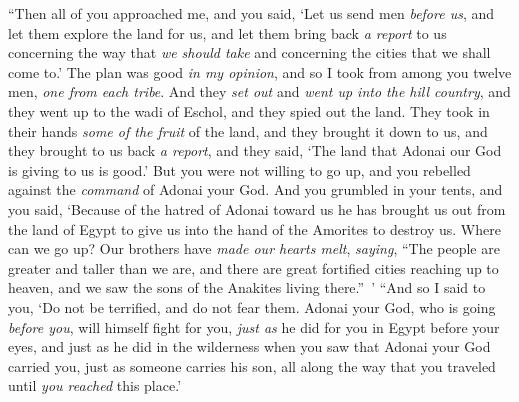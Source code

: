 \begin{biblechapter}
\verse “Then all of you approached me, and you said, ‘Let us send men \textit{before us}, and let them explore the land for us, and let them bring back \textit{a report} to us concerning the way that \textit{we should take} and concerning the cities that we shall come to.’
\verse The plan was good \textit{in my opinion}, and so I took from among you twelve men, \textit{one from each tribe}.
\verse And they \textit{set out} and \textit{went up into the hill country}, and they went up to the wadi of Eschol, and they spied out the land.
\verse They took in their hands \textit{some of the fruit} of the land, and they brought it down to us, and they brought to us back \textit{a report}, and they said, ‘The land that Adonai our God is giving to us is good.’
\verse But you were not willing to go up, and you rebelled against the \textit{command} of Adonai your God.
\verse And you grumbled in your tents, and you said, ‘Because of the hatred of Adonai toward us he has brought us out from the land of Egypt to give us into the hand of the Amorites to destroy us.
\verse Where can we go up? Our brothers have \textit{made our hearts melt}, \textit{saying}, “The people are greater and taller than we are, and there are great fortified cities reaching up to heaven, and we saw the sons of the Anakites living there.” ’
\verse “And so I said to you, ‘Do not be terrified, and do not fear them.
\verse Adonai your God, who is going \textit{before you}, will himself fight for you, \textit{just as} he did for you in Egypt before your eyes,
\verse and just as he did in the wilderness when you saw that Adonai your God carried you, just as someone carries his son, all along the way that you traveled until \textit{you reached} this place.’

\end{biblechapter}
